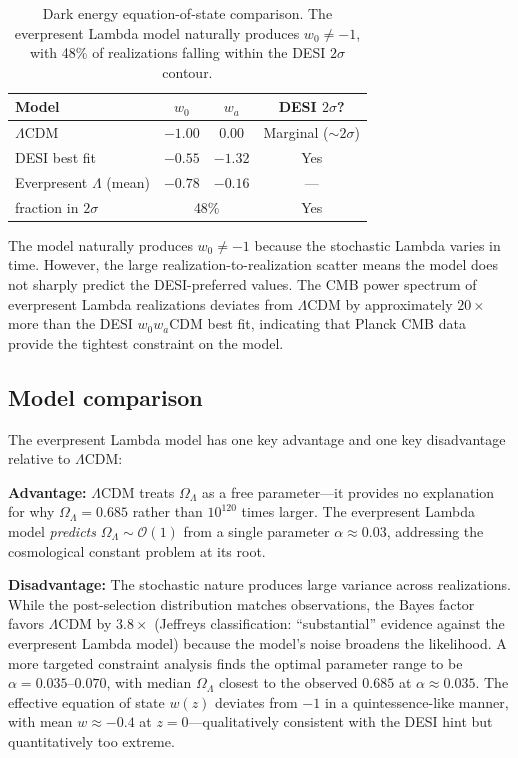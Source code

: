 \documentclass[aps,prd,twocolumn,superscriptaddress,nofootinbib]{revtex4-2}
\begin{document}
\begin{table}[h]
\centering
\begin{tabular}{lccc}
\toprule
Model & $w_0$ & $w_a$ & DESI $2\sigma$? \\
\midrule
$\Lambda$CDM & $-1.00$ & $0.00$ & Marginal ($\sim$$2\sigma$) \\
DESI best fit & $-0.55$ & $-1.32$ & Yes \\
Everpresent $\Lambda$ (mean) & $-0.78$ & $-0.16$ & --- \\
\quad fraction in $2\sigma$ & \multicolumn{2}{c}{48\%} & Yes \\
\bottomrule
\end{tabular}
\caption{Dark energy equation-of-state comparison. The everpresent Lambda model naturally produces $w_0 \neq -1$, with 48\% of realizations falling within the DESI $2\sigma$ contour.}
\label{tab:desi}
\end{table}

The model naturally produces $w_0 \neq -1$ because the stochastic Lambda varies in time. However, the large realization-to-realization scatter means the model does not sharply predict the DESI-preferred values. The CMB power spectrum of everpresent Lambda realizations deviates from $\Lambda$CDM by approximately $20\times$ more than the DESI $w_0 w_a$CDM best fit, indicating that Planck CMB data provide the tightest constraint on the model.

\subsection{Model comparison}

The everpresent Lambda model has one key advantage and one key disadvantage relative to $\Lambda$CDM:

\textbf{Advantage:} $\Lambda$CDM treats $\Omega_\Lambda$ as a free parameter---it provides no explanation for why $\Omega_\Lambda = 0.685$ rather than $10^{120}$ times larger. The everpresent Lambda model \emph{predicts} $\Omega_\Lambda \sim \mathcal{O}(1)$ from a single parameter $\alpha \approx 0.03$, addressing the cosmological constant problem at its root.

\textbf{Disadvantage:} The stochastic nature produces large variance across realizations. While the post-selection distribution matches observations, the Bayes factor favors $\Lambda$CDM by $3.8\times$ (Jeffreys classification: ``substantial'' evidence against the everpresent Lambda model) because the model's noise broadens the likelihood. A more targeted constraint analysis finds the optimal parameter range to be $\alpha = 0.035$--$0.070$, with median $\Omega_\Lambda$ closest to the observed $0.685$ at $\alpha \approx 0.035$. The effective equation of state $w(z)$ deviates from $-1$ in a quintessence-like manner, with mean $w \approx -0.4$ at $z = 0$---qualitatively consistent with the DESI hint but quantitatively too extreme.
\end{document}
